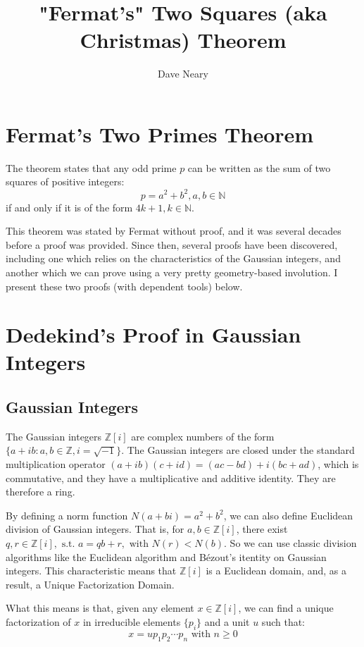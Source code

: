 \documentclass{article}
\begin{document}
\title{"Fermat's" Two Squares (aka Christmas) Theorem}
\author{Dave Neary}

\maketitle

\section{Fermat's Two Primes Theorem}

The theorem states that any odd prime $p$ can be written as the sum of two squares of
positive integers:
\[ p = a^2 + b^2 , a, b \in \mathbb{N} \]
if and only if it is of the form $4k+1, k\in \mathbb{N}$.

This theorem was stated by Fermat without proof, and it was several decades before a proof
was provided. Since then, several proofs have been discovered, including one which relies 
on the characteristics of the Gaussian integers, and another which we can prove using a
very pretty geometry-based involution. I present these two proofs (with dependent tools)
below.

\section{Dedekind's Proof in Gaussian Integers}

\subsection{Gaussian Integers}

The Gaussian integers $\mathbb{Z}[i]$ are complex numbers of the form 
$\{a+ib:a,b\in \mathbb{Z}, i=\sqrt{-1}\}$. The Gaussian integers are closed under
the standard multiplication operator $(a+ib)(c+id) = (ac-bd) + i(bc+ad)$, which is commutative,
and they have a multiplicative and additive identity. They are therefore a ring.

By defining a norm function $N(a+bi) = a^2+b^2$, we can also define Euclidean division of
Gaussian integers. That is, for $a,b \in \mathbb{Z}[i]$, there exist $q,r \in \mathbb{Z}[i],
\text{ s.t. } a=qb+r, \text{ with } N(r)<N(b)$. So we can use classic division
algorithms like  the Euclidean algorithm and Bézout's itentity on Gaussian integers. This
characteristic means that $\mathbb{Z}[i]$ is a Euclidean domain, and, as a result, a Unique
Factorization Domain.

What this means is that, given any element $x \in \mathbb{Z}[i]$, we can find a unique
factorization of $x$ in irreducible elements $\{p_i\}$ and a unit $u$ such that:
\[ x = up_1p_2\cdots p_n \text{ with } n\geq 0 \]
\end{document}
